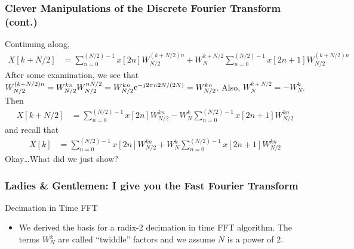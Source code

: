 \documentclass[mathserif,9pt,handout]{beamer}
\begin{document}
\begin{frame}\frametitle{Clever Manipulations of the Discrete Fourier Transform (cont.)}\small
  Continuing along, 
  \begin{align}
    X[k+N/2] &= \sum_{n=0}^{(N/2)-1} x[2n] W_{N/2}^{(k+N/2)n} + W_N^{k+N/2} \sum_{n=0}^{(N/2)-1} x[2n+1] W_{N/2}^{(k+N/2)n} \nonumber 
  \end{align}
  After some examination, we see that $W_{N/2}^{(k+N/2)n} = W_{N/2}^{kn} W_{N/2}^{nN/2} = W_{N/2}^{kn} {\textrm{e}}^{-j2\pi n 2N/(2N)} = W_{N/2}^{kn}$. Also, $W_N^{k+N/2} =  -W_N^{k}$. Then 
  \begin{align}
    X[k+N/2] &= \sum_{n=0}^{(N/2)-1} x[2n] W_{N/2}^{kn} -W_N^{k} \sum_{n=0}^{(N/2)-1} x[2n+1] W_{N/2}^{kn}\nonumber 
  \end{align}
  and recall that 
  \begin{align}
    X[k] &= \sum_{n=0}^{(N/2)-1} x[2n] W_{N/2}^{kn} + W_N^{k} \sum_{n=0}^{(N/2)-1} x[2n+1] W_{N/2}^{kn} \nonumber 
  \end{align}
  Okay\ldots What did we just show? 
\end{frame}


\begin{frame}\frametitle{Ladies \& Gentlemen: I give you the Fast Fourier Transform}\small
  \begin{block}{Decimation in Time FFT}
    \begin{itemize}
      \item We derived the basis for a radix-2 decimation in time FFT algorithm. The terms $W_N^{k}$ are called ``twiddle'' factors and we assume $N$ is a power of 2. 
    \end{itemize}
  \end{block}
\end{frame}
\end{document}
